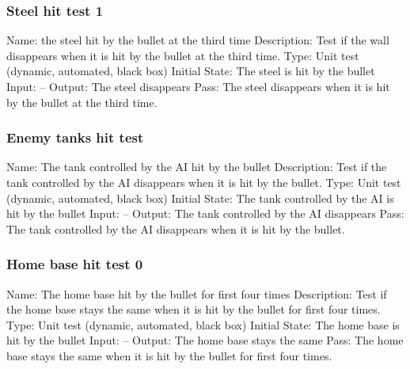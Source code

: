 \documentclass{article}
\begin{document}
\subsubsection{Steel hit test 1}
Name:  the steel hit by the bullet at the third time\newline
Description: Test if the wall disappears when it is hit by the bullet at the third time. \newline
Type: Unit test (dynamic, automated, black box) \newline
Initial State:  The steel is hit by the bullet \newline
Input: --\newline
Output: The steel disappears \newline
Pass:   The steel disappears when it is hit by the bullet at the third time. \newline


\subsubsection{Enemy tanks hit test}
Name:  The tank controlled by the AI hit by the bullet\newline
Description: Test if the tank controlled by the AI disappears when it is hit by the bullet. \newline
Type: Unit test (dynamic, automated, black box) \newline
Initial State:  The tank controlled by the AI is hit by the bullet \newline
Input: --\newline
Output: The tank controlled by the AI disappears \newline
Pass: The tank controlled by the AI disappears when it is hit by the bullet. \newline


\subsubsection{Home base hit test 0}
Name:  The home base hit by the bullet for first four times\newline
Description: Test if the home base stays the same when it is hit by the bullet for first four times. \newline
Type: Unit test (dynamic, automated, black box) \newline
Initial State:  The home base is hit by the bullet \newline
Input: --\newline
Output: The home base stays the same \newline
Pass:  The home base stays the same when it is hit by the bullet for first four times. \newline
\end{document}
